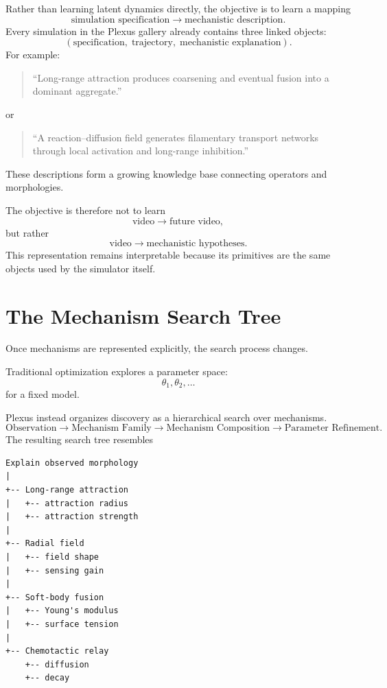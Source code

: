 \documentclass[11pt]{article}
\begin{document}
Rather than learning latent dynamics directly, the objective is to learn a
mapping
\[
\text{simulation specification}
\longrightarrow
\text{mechanistic description}.
\]
Every simulation in the Plexus gallery already contains three linked objects:
\[
(\text{specification},\;
\text{trajectory},\;
\text{mechanistic explanation}).
\]
For example:

\begin{quote}
``Long-range attraction produces coarsening and eventual fusion into a dominant
aggregate.''
\end{quote}

or

\begin{quote}
``A reaction--diffusion field generates filamentary transport networks through
local activation and long-range inhibition.''
\end{quote}

These descriptions form a growing knowledge base connecting operators and
morphologies.

The objective is therefore not to learn
\[
\text{video}
\rightarrow
\text{future video},
\]
but rather
\[
\text{video}
\rightarrow
\text{mechanistic hypotheses}.
\]
This representation remains interpretable because its primitives are the same
objects used by the simulator itself.

\section{The Mechanism Search Tree}
\label{sec:search-tree}

Once mechanisms are represented explicitly, the search process changes.

Traditional optimization explores a parameter space:
\[
\theta_1,\theta_2,\ldots
\]
for a fixed model.

Plexus instead organizes discovery as a hierarchical search over mechanisms.
\[
\text{Observation}
\rightarrow
\text{Mechanism Family}
\rightarrow
\text{Mechanism Composition}
\rightarrow
\text{Parameter Refinement}.
\]
The resulting search tree resembles

\begin{verbatim}
Explain observed morphology
|
+-- Long-range attraction
|   +-- attraction radius
|   +-- attraction strength
|
+-- Radial field
|   +-- field shape
|   +-- sensing gain
|
+-- Soft-body fusion
|   +-- Young's modulus
|   +-- surface tension
|
+-- Chemotactic relay
    +-- diffusion
    +-- decay
\end{verbatim}
\end{document}
